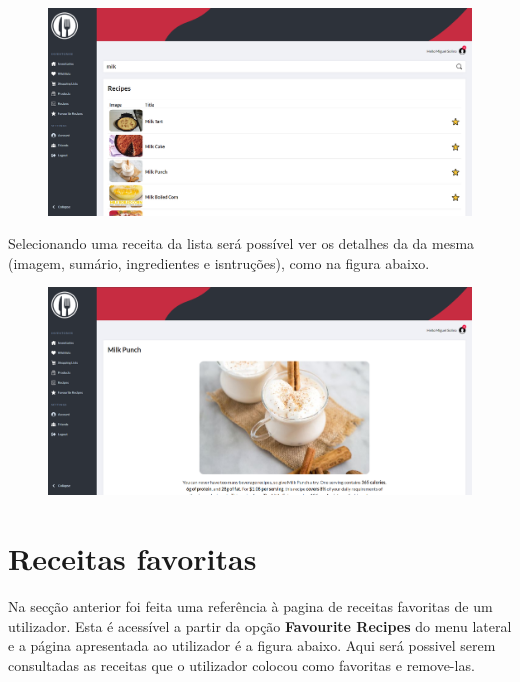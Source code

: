 \documentclass[a4paper]{report}
\begin{document}
    \begin{figure}[H]
        \centering
            \includegraphics[width=\textwidth]{images/produto_final/procura_de_receitas_efetuadas.png}
    \end{figure}

    Selecionando uma receita da lista será possível ver os detalhes da
    da mesma (imagem, sumário, ingredientes e isntruções), como na 
    figura abaixo.

    \begin{figure}[H]
        \centering
            \includegraphics[width=\textwidth]{images/produto_final/receitas.png}
    \end{figure}

    \section{Receitas favoritas}
    Na secção anterior foi feita uma referência à pagina de receitas favoritas
    de um utilizador. Esta é acessível a partir da opção 
    \textbf{Favourite Recipes} do menu lateral e a página apresentada ao 
    utilizador é a figura abaixo. Aqui será possivel serem consultadas as
    receitas que o utilizador colocou como favoritas e remove-las.
\end{document}
